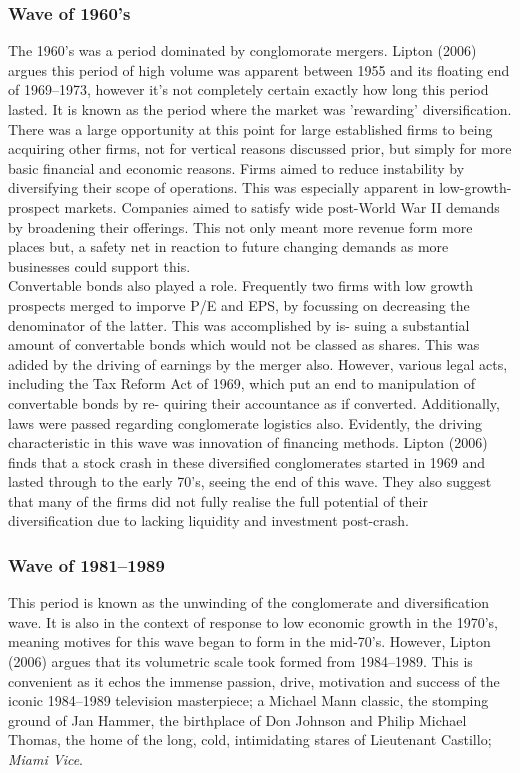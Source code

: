 \documentclass[11pt, english]{article}
\begin{document}
                \subsubsection*{Wave of 1960's}

	The 1960's was a period dominated by conglomorate mergers. Lipton (2006) argues this period of high volume was apparent between 1955 and its floating end of 1969--1973, however it's not completely certain exactly how long this period lasted. It is known as the period where the market was 'rewarding' diversification. There was a large opportunity at this point for large established firms to being acquiring other firms, not for vertical reasons discussed prior, but simply for more basic financial and economic reasons. Firms aimed to reduce instability by diversifying their scope of operations. This was especially apparent in low-growth-prospect markets. Companies aimed to satisfy wide post-World War II demands by broadening their offerings. This not only meant more revenue form more places but, a safety net in reaction to future changing demands as more businesses could support this.\\

	Convertable bonds also played a role. Frequently two firms with low growth prospects merged to imporve P/E and EPS, by focussing on decreasing the denominator of the latter. This was accomplished by is- suing a substantial amount of convertable bonds which would not be classed as shares. This was adided by the driving of earnings by the merger also. However, various legal acts, including the Tax Reform Act of 1969, which put an end to manipulation of convertable bonds by re- quiring their accountance as if converted. Additionally, laws were passed regarding conglomerate logistics also. Evidently, the driving characteristic in this wave was innovation of financing methods. Lipton (2006) finds that a stock crash in these diversified conglomerates started in 1969 and lasted through to the early 70's, seeing the end of this wave. They also suggest that many of the firms did not fully realise the full potential of their diversification due to lacking liquidity and investment post-crash.

                \subsubsection*{Wave of 1981--1989}

        This period is known as the unwinding of the conglomerate and diversification wave. It is also in the context of response to low economic growth in the 1970's, meaning motives for this wave began to form in the mid-70's. However, Lipton (2006) argues that its volumetric scale took formed from 1984--1989. This is convenient as it echos the immense passion, drive, motivation and success of the iconic 1984--1989 television masterpiece; a Michael Mann classic, the stomping ground of Jan Hammer, the birthplace of Don Johnson and Philip Michael Thomas, the home of the long, cold, intimidating stares of Lieutenant Castillo; \textit{Miami Vice}.\\
\end{document}
